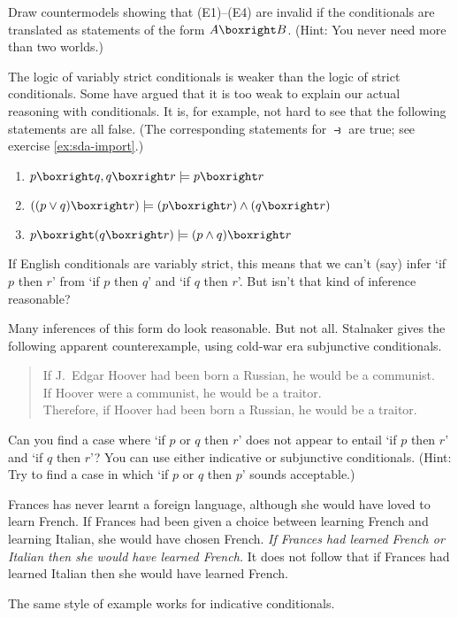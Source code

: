 \begin{exercise}
  Draw countermodels showing that (E1)--(E4) are invalid if the conditionals are
  translated as statements of the form $A \boxright B$. (Hint: You never need
  more than two worlds.)
\end{exercise}

The logic of variably strict conditionals is weaker than the logic of strict
conditionals. Some have argued that it is too weak to explain our actual
reasoning with conditionals. It is, for example, not hard to see that the
following statements are all false. (The corresponding statements for
$\strictif$ are true; see exercise \ref{ex:sda-import}.)
\begin{enumerate}[leftmargin=10mm]
  \itemsep-1mm
\item $p \boxright q, q \boxright r \models p \boxright r$
\item $((p \lor q) \boxright r) \models (p \boxright r) \land (q \boxright r)$
\item $p \boxright (q \boxright r) \models (p \land q) \boxright r$
\end{enumerate}
If English conditionals are variably strict, this means that we can't (say)
infer `if $p$ then $r$' from `if $p$ then $q$' and `if $q$ then $r$'. But isn't
that kind of inference reasonable?

Many inferences of this form do look reasonable. But not all. Stalnaker gives the
following apparent counterexample, using cold-war era subjunctive conditionals.
\begin{quote}
  If J.\ Edgar Hoover had been born a Russian, he would be a communist.\\
  If Hoover were a communist, he would be a traitor.\\
  Therefore, if Hoover had been born a Russian, he would be a traitor.
\end{quote}

\begin{exercise}
  Can you find a case where `if $p$ or $q$ then $r$' does not appear to entail
  `if $p$ then $r$' and `if $q$ then $r$'? You can use either indicative or
  subjunctive conditionals. (Hint: Try to find a case in which `if $p$ or $q$
  then $p$' sounds acceptable.)
\end{exercise}
\begin{solution}
  Frances has never learnt a foreign language, although she would have loved to
  learn French. If Frances had been given a choice between learning French and
  learning Italian, she would have chosen French. \emph{If Frances had learned
    French or Italian then she would have learned French.} It does not follow that
  if Frances had learned Italian then she would have learned French.

  The same style of example works for indicative conditionals.
\end{solution}

